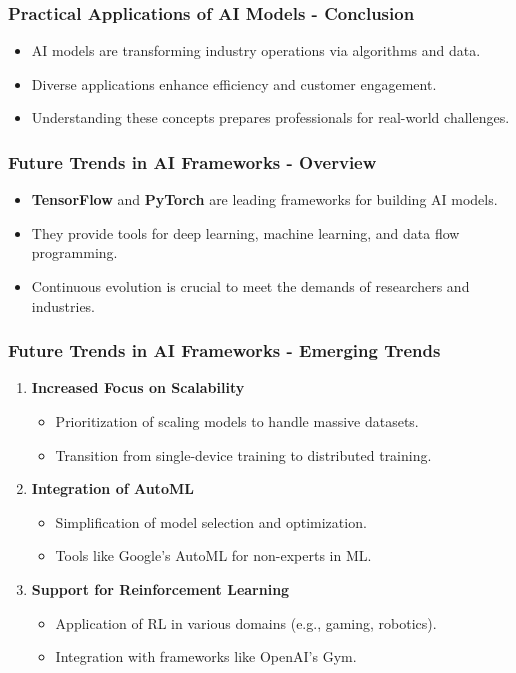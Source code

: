 \documentclass[aspectratio=169]{beamer}
\begin{document}
\begin{frame}[fragile]
    \frametitle{Practical Applications of AI Models - Conclusion}
    \begin{itemize}
        \item AI models are transforming industry operations via algorithms and data.
        \item Diverse applications enhance efficiency and customer engagement.
        \item Understanding these concepts prepares professionals for real-world challenges.
    \end{itemize}
\end{frame}

\begin{frame}[fragile]
    \frametitle{Future Trends in AI Frameworks - Overview}
    \begin{itemize}
        \item \textbf{TensorFlow} and \textbf{PyTorch} are leading frameworks for building AI models.
        \item They provide tools for deep learning, machine learning, and data flow programming.
        \item Continuous evolution is crucial to meet the demands of researchers and industries.
    \end{itemize}
\end{frame}

\begin{frame}[fragile]
    \frametitle{Future Trends in AI Frameworks - Emerging Trends}
    \begin{enumerate}
        \item \textbf{Increased Focus on Scalability}
            \begin{itemize}
                \item Prioritization of scaling models to handle massive datasets.
                \item Transition from single-device training to distributed training.
            \end{itemize}
            
        \item \textbf{Integration of AutoML}
            \begin{itemize}
                \item Simplification of model selection and optimization.
                \item Tools like Google’s AutoML for non-experts in ML.
            \end{itemize}

        \item \textbf{Support for Reinforcement Learning}
            \begin{itemize}
                \item Application of RL in various domains (e.g., gaming, robotics).
                \item Integration with frameworks like OpenAI’s Gym.
            \end{itemize}
    \end{enumerate}
\end{frame}
\end{document}
